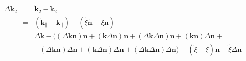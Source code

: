 \documentclass[12pt,a4paper,twoside,openright,BCOR10mm,headsepline,titlepage,abstracton,chapterprefix,final]{scrreprt}
\newcommand\Vector[1]{{\mathbf{#1}}}
\newcommand\wavenumber{k}
\newcommand\Wavevector{\Vector{\wavenumber}}
\begin{document}
\begin{eqnarray}
 \Delta\Wavevector_2 &=& \tilde{\Wavevector}_2 - \Wavevector_2 \\
 &=& ( \tilde{\Wavevector}_{\parallel} - \Wavevector_{\parallel} ) + ( \tilde{\xi} \tilde{\Vector{n}} - \xi \Vector{n} ) \\
 &=& \Delta\Wavevector - 
 \bigg(
   (\Delta\Wavevector \Vector{n} )\Vector{n} 
   + (\Wavevector \Delta\Vector{n} )\Vector{n}  + (\Delta\Wavevector \Delta\Vector{n} )\Vector{n} 
   + (\Wavevector \Vector{n} )\Delta\Vector{n}  + 
  \nonumber \\ &&
   + (\Delta\Wavevector \Vector{n} )\Delta\Vector{n} 
   + (\Wavevector \Delta\Vector{n} )\Delta\Vector{n}
   + (\Delta\Wavevector \Delta\Vector{n} )\Delta\Vector{n}
 \bigg) 
 + ( \tilde{\xi} - \xi ) \Vector{n} + \tilde{\xi} \Delta\Vector{n}
\end{eqnarray}
\end{document}
